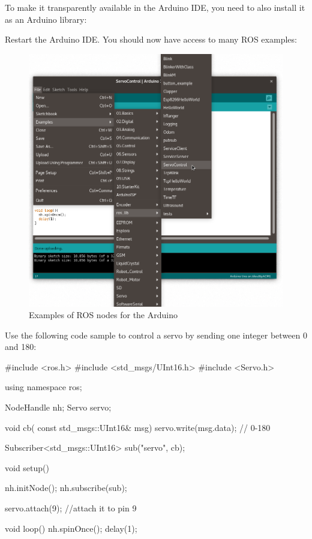 \documentclass{instructions}
\begin{document}
To make it transparently available in the Arduino IDE, you need to also
install it as an Arduino library:


Restart the Arduino IDE. You should now have access to many ROS examples:

\begin{figure}[h!]
    \centering
    \includegraphics[width=0.9\linewidth]{arduino-ide-ros}
    \caption{Examples of ROS nodes for the Arduino}
    \label{}
\end{figure}




Use the following code sample to control a servo by sending one integer between
0 and 180:

\begin{cppcode}
#include <ros.h>
#include <std_msgs/UInt16.h>
#include <Servo.h> 

using namespace ros;

NodeHandle  nh;
Servo servo;

void cb( const std_msgs::UInt16& msg){
  servo.write(msg.data); // 0-180
}

Subscriber<std_msgs::UInt16> sub("servo", cb);

void setup(){
  nh.initNode();
  nh.subscribe(sub);

  servo.attach(9); //attach it to pin 9
}

void loop(){
  nh.spinOnce();
  delay(1);
}

\end{cppcode}
\end{document}
